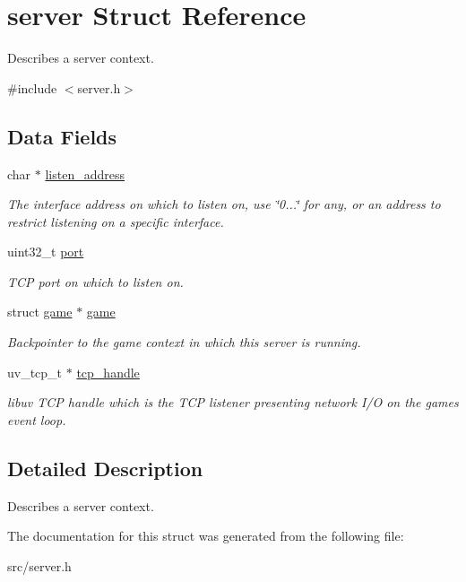 \hypertarget{structserver}{}\section{server Struct Reference}
\label{structserver}


Describes a server context.  




{\ttfamily \#include $<$server.\+h$>$}

\subsection*{Data Fields}
\begin{DoxyCompactItemize}
\item 
\hypertarget{structserver_a1e6a3204983da9b6b8a22149a1eceb1a}{}char $\ast$ \hyperlink{structserver_a1e6a3204983da9b6b8a22149a1eceb1a}{listen\+\_\+address}\label{structserver_a1e6a3204983da9b6b8a22149a1eceb1a}

\begin{DoxyCompactList}\small\item\em The interface address on which to listen on, use {\ttfamily \char`\"{}0...\char`\"{}} for any, or an address to restrict listening on a specific interface. \end{DoxyCompactList}\item 
\hypertarget{structserver_a8a4c46346a063f664085f4a89610f1ae}{}uint32\+\_\+t \hyperlink{structserver_a8a4c46346a063f664085f4a89610f1ae}{port}\label{structserver_a8a4c46346a063f664085f4a89610f1ae}

\begin{DoxyCompactList}\small\item\em T\+C\+P port on which to listen on. \end{DoxyCompactList}\item 
\hypertarget{structserver_a372bbf7bb184c187bc1800eef829cc31}{}struct \hyperlink{structgame}{game} $\ast$ \hyperlink{structserver_a372bbf7bb184c187bc1800eef829cc31}{game}\label{structserver_a372bbf7bb184c187bc1800eef829cc31}

\begin{DoxyCompactList}\small\item\em Backpointer to the game context in which this server is running. \end{DoxyCompactList}\item 
\hypertarget{structserver_a5712c1e56ae6c3838c9bfb62493dedb3}{}uv\+\_\+tcp\+\_\+t $\ast$ \hyperlink{structserver_a5712c1e56ae6c3838c9bfb62493dedb3}{tcp\+\_\+handle}\label{structserver_a5712c1e56ae6c3838c9bfb62493dedb3}

\begin{DoxyCompactList}\small\item\em libuv T\+C\+P handle which is the T\+C\+P listener presenting network I/\+O on the game\textquotesingle{}s event loop. \end{DoxyCompactList}\end{DoxyCompactItemize}


\subsection{Detailed Description}
Describes a server context. 

The documentation for this struct was generated from the following file\+:\begin{DoxyCompactItemize}
\item 
src/server.\+h\end{DoxyCompactItemize}
